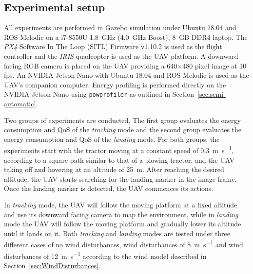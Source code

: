 \documentclass[conference]{IEEEtran}
\newcommand{\stt}[1]{{\small\tt #1}} %
\newcommand{\powprof}{\stt{powprofiler}}
\begin{document}

\subsection{Experimental setup}

All experiments are performed in Gazebo simulation under Ubuntu 18.04
and ROS Melodic on a i7-8550U 1.8~GHz (4.0~GHz Boost), 8~GB DDR4
laptop. The \emph{PX4} Software In The Loop (SITL) Firmware v1.10.2 is used as the flight
controller and the \emph{IRIS} quadcopter is used as the UAV platform. A
downward facing RGB camera is placed on the UAV providing a
\SI{640}{}$\times$\SI{480}{} pixel image at 10 fps. An NVIDIA Jetson Nano
with Ubuntu 18.04 and ROS Melodic is used as the UAV's companion
computer. 
%
Energy profiling is performed directly on the NVIDIA Jetson
  Nano using \powprof{} as outlined in Section~\ref{sec:semi-automatic}.

Two groups of experiments are conducted. The first group evaluates the
energy consumption and QoS of the \emph{tracking} mode and the second group
evaluates the energy consumption and QoS of the \emph{landing} mode. For
both groups, the experiments start with the tractor moving at a
constant speed of \SI{0.3}{\meter\per\second}, according to a square path similar to that of a
plowing tractor, and the UAV taking off and hovering at an altitude of
\SI{25}{\meter}. After reaching the desired altitude, the UAV starts searching
for the landing marker in the image frame. Once the landing marker is
detected, the UAV commences its actions.

In \emph{tracking} mode, the UAV will follow the moving platform at a fixed
altitude and use its downward facing camera to map the environment,
while in \emph{landing} mode the UAV will follow the moving platform and
gradually lower its altitude until it lands on it. Both \emph{tracking} and
\emph{landing} modes are tested under three different cases of no wind
disturbances, wind disturbances of \SI{8}{\meter \per \second} and wind disturbances of
\SI{12}{\meter \per \second} according to the wind model described in Section~\ref{sec:WindDisturbances}.
\end{document}
